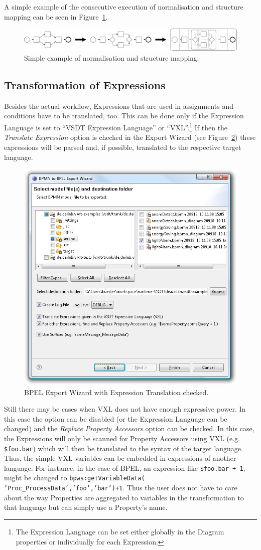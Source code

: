 A simple example of the consecutive execution of normalisation and structure
mapping can be seen in Figure~\ref{fig:norm_struc}.

\begin{figure}[ht]
	\centering
	\includegraphics[width=\textwidth]{figures/trafo/norm_struc.pdf}
	\caption{Simple example of normalisation and structure mapping.}
	\label{fig:norm_struc}
\end{figure}


\subsection{Transformation of Expressions}

Besides the actual workflow, Expressions that are used in assignments and
conditions have to be translated, too.  This can be done only if the Expression
Language is set to ``VSDT Expression Language'' or ``VXL''.\footnote{The Expression
Language can be set either globally in the Diagram properties or individually for
each Expression.} If then the \emph{Translate Expression} option is checked in
the Export Wizard (see Figure~\ref{fig:trafo_wiz}) these expressions will be
parsed and, if possible, translated to the respective target language.

\begin{figure}[ht]
	\centering
	\includegraphics[width=.5\textwidth]{figures/features/exportWiz.png}
	\caption{BPEL Export Wizard with Expression Translation checked.}
	\label{fig:trafo_wiz}
\end{figure}

Still there may be cases when VXL does not have enough expressive power.  In this
case the option can be disabled (or the Expression Language can be changed) and
the \emph{Replace Property Accessors} option can be checked.  In this case, the
Expressions will only be scanned for Property Accessors using VXL (e.g.
\texttt{\$foo.bar}) which will then be translated to the syntax of the target
language.  Thus, the simple VXL variables can be embedded in expressions of
another language.  For instance, in the case of BPEL, an expression like
\texttt{\$foo.bar + 1}, might be changed to \texttt{bpws:getVariableData(
'Proc\_ProcessData','foo','bar')+1}.  Thus the user does not have to care about
the way Properties are aggregated to variables in the transformation to that
language but can simply use a Property's name.

